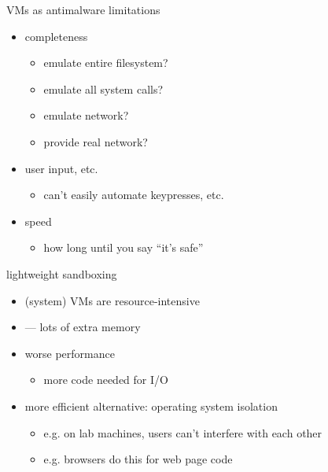 \begin{frame}{VMs as antimalware limitations}
    \begin{itemize}
    \item completeness
        \begin{itemize}
        \item emulate entire filesystem?
        \item emulate all system calls?
        \item emulate network?
        \item provide real network?
        \end{itemize}
    \item user input, etc.
        \begin{itemize}
        \item can't easily automate keypresses, etc.
        \end{itemize}
    \item speed
        \begin{itemize}
        \item how long until you say ``it's safe''
        \end{itemize}
    \end{itemize}
\end{frame}

\begin{frame}{lightweight sandboxing}
\begin{itemize}
    \item (system) VMs are resource-intensive
    \item {} --- lots of extra memory
    \item worse performance
        \begin{itemize}
        \item more code needed for I/O
        \end{itemize}
    \vspace{1cm}
    \item more efficient alternative: operating system isolation
        \begin{itemize}
        \item e.g. on lab machines, users can't interfere with each other
        \item e.g. browsers do this for web page code
    \end{itemize}
\end{itemize}
\end{frame}


